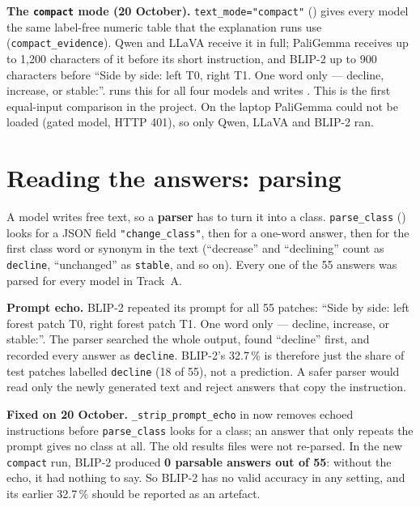 \begin{newinfo}
\textbf{The \texttt{compact} mode (20 October).} \texttt{text\_mode="compact"} () gives every model the same label-free numeric table that the explanation runs use (\texttt{compact\_evidence}). Qwen and LLaVA receive it in full; PaliGemma receives up to 1,200 characters of it before its short instruction, and BLIP-2 up to 900 characters before ``Side by side: left T0, right T1. One word only --- decline, increase, or stable:''.  runs this for all four models and writes . This is the first equal-input comparison in the project. On the laptop PaliGemma could not be loaded (gated model, HTTP 401), so only Qwen, LLaVA and BLIP-2 ran.
\end{newinfo}

\section{Reading the answers: parsing}

A model writes free text, so a \textbf{parser} has to turn it into a class. \texttt{parse\_class} () looks for a JSON field \texttt{"change\_class"}, then for a one-word answer, then for the first class word or synonym in the text (``decrease'' and ``declining'' count as \texttt{decline}, ``unchanged'' as \texttt{stable}, and so on). Every one of the 55 answers was parsed for every model in Track~A.

\begin{watchout}
\textbf{Prompt echo.} BLIP-2 repeated its prompt for all 55 patches: ``Side by side: left forest patch T0, right forest patch T1. One word only --- decline, increase, or stable:''. The parser searched the whole output, found ``decline'' first, and recorded every answer as \texttt{decline}. BLIP-2's 32.7\,\% is therefore just the share of test patches labelled \texttt{decline} (18 of 55), not a prediction. A safer parser would read only the newly generated text and reject answers that copy the instruction.
\end{watchout}

\begin{newinfo}
\textbf{Fixed on 20 October.} \texttt{\_strip\_prompt\_echo} in  now removes echoed instructions before \texttt{parse\_class} looks for a class; an answer that only repeats the prompt gives no class at all. The old results files were not re-parsed. In the new \texttt{compact} run, BLIP-2 produced \textbf{0 parsable answers out of 55}: without the echo, it had nothing to say. So BLIP-2 has no valid accuracy in any setting, and its earlier 32.7\,\% should be reported as an artefact.
\end{newinfo}

